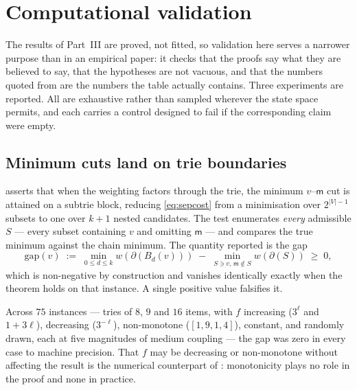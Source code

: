 \documentclass[11pt,twocolumn,a4paper]{article}
\theoremstyle{thmstyle}
\theoremstyle{definition}
\theoremstyle{remark}
\newcommand{\V}{V}
\newcommand{\wt}{w}
\newcommand{\med}{\mathsf{m}}
\newcommand{\cut}{\partial}
\newcommand{\gapv}{\mathrm{gap}}
\newcommand{\abs}[1]{\lvert#1\rvert}
\begin{document}
\section{Computational validation}
\label{sec:validation}

The results of Part~III are proved, not fitted, so validation here
serves a narrower purpose than in an empirical paper: it checks that
the proofs say what they are believed to say, that the hypotheses are
not vacuous, and that the numbers quoted from  are the
numbers the table actually contains. Three experiments are reported.
All are exhaustive rather than sampled wherever the state space
permits, and each carries a control designed to fail if the
corresponding claim were empty.

\subsection{Minimum cuts land on trie boundaries}
\label{sec:val-a}

 asserts that when the weighting factors through
the trie, the minimum $v$--$\med$ cut is attained on a subtrie block,
reducing \eqref{eq:sepcost} from a minimisation over $2^{\abs{\V}-1}$
subsets to one over $k+1$ nested candidates. The test enumerates
\emph{every} admissible $S$ --- every subset containing $v$ and omitting
$\med$ --- and compares the true minimum against the chain minimum. The
quantity reported is the gap
\begin{equation}
  \gapv(v) \;:=\; \min_{0\leq d\leq k}\wt(\cut(B_d(v)))
              \;-\; \min_{S \ni v,\, \med \notin S}\wt(\cut(S))
  \;\geq\; 0,
  \label{eq:gap}
\end{equation}
which is non-negative by construction and vanishes identically exactly
when the theorem holds on that instance. A single positive value
falsifies it.

Across $75$ instances --- tries of $8$, $9$ and $16$ items, with $f$
increasing ($3^{\ell}$ and $1+3\ell$), decreasing ($3^{-\ell}$),
non-monotone ($[1,9,1,4]$), constant, and randomly drawn, each at five
magnitudes of medium coupling --- the gap was zero in every case to
machine precision. That $f$ may be decreasing or non-monotone without
affecting the result is the numerical counterpart of
: monotonicity plays no role in the
proof and none in practice.
\end{document}
